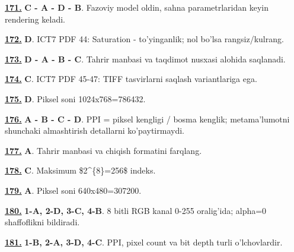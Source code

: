 \documentclass[10pt,a4paper,oneside]{article}
\begin{document}
\noindent\hyperlink{q171}{\textbf{171.}} \textbf{C - A - D - B}.  Fazoviy model oldin, sahna parametrlaridan keyin rendering keladi.
\par\vspace{3mm}
\noindent\hyperlink{q172}{\textbf{172.}} \textbf{D}.  ICT7 PDF 44: Saturation - to'yinganlik; nol bo'lsa rangsiz/kulrang.
\par\vspace{3mm}
\noindent\hyperlink{q173}{\textbf{173.}} \textbf{D - A - B - C}.  Tahrir manbasi va taqdimot nusxasi alohida saqlanadi.
\par\vspace{3mm}
\noindent\hyperlink{q174}{\textbf{174.}} \textbf{C}.  ICT7 PDF 45-47: TIFF tasvirlarni saqlash variantlariga ega.
\par\vspace{3mm}
\noindent\hyperlink{q175}{\textbf{175.}} \textbf{D}.  Piksel soni 1024x768=786432.
\par\vspace{3mm}
\noindent\hyperlink{q176}{\textbf{176.}} \textbf{A - B - C - D}.  PPI = piksel kengligi / bosma kenglik; metama'lumotni shunchaki almashtirish detallarni ko'paytirmaydi.
\par\vspace{3mm}
\noindent\hyperlink{q177}{\textbf{177.}} \textbf{A}.  Tahrir manbasi va chiqish formatini farqlang.
\par\vspace{3mm}
\noindent\hyperlink{q178}{\textbf{178.}} \textbf{C}.  Maksimum \$2\textasciicircum{}\{8\}=256\$ indeks.
\par\vspace{3mm}
\noindent\hyperlink{q179}{\textbf{179.}} \textbf{A}.  Piksel soni 640x480=307200.
\par\vspace{3mm}
\noindent\hyperlink{q180}{\textbf{180.}} \textbf{1-A, 2-D, 3-C, 4-B}.  8 bitli RGB kanal 0-255 oralig'ida; alpha=0 shaffoflikni bildiradi.
\par\vspace{3mm}
\noindent\hyperlink{q181}{\textbf{181.}} \textbf{1-B, 2-A, 3-D, 4-C}.  PPI, pixel count va bit depth turli o'lchovlardir.
\par\vspace{3mm}
\end{document}
